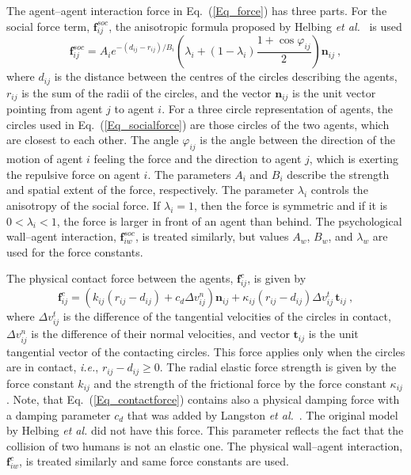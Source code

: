 \documentclass[12pt,a4paper,final,twoside]{stylevk}
\begin{document}
The agent--agent interaction force in Eq.~(\ref{Eq_force}) has three
parts.  For the social force term, $\mathbf{f}_{ij}^{soc}$, the
anisotropic formula proposed by Helbing {\em et al.}~\cite{Helbing02}
is used
%
\begin{equation}\label{Eq_socialforce}
 \mathbf{f}_{ij}^{soc} = A_i e^{-(d_{ij}-r_{ij})/B_i }
 \left ( \lambda_i + (1-\lambda_i) \frac{1 + \cos \varphi_{ij}}{2}
 \right )  \mathbf{n}_{ij} ~, 
\end{equation}
%
where $d_{ij}$ is the distance between the centres of the circles
describing the agents, $r_{ij}$ is the sum of the radii of the
circles, and the vector $\mathbf{n}_{ij}$ is the unit vector pointing
from agent $j$ to agent $i$.  For a three circle representation of
agents, the circles used in Eq.~(\ref{Eq_socialforce}) are those
circles of the two agents, which are closest to each other.  The angle
$\varphi_{ij}$ is the angle between the direction of the motion of
agent $i$ feeling the force and the direction to agent $j$, which is
exerting the repulsive force on agent $i$.  The parameters $A_i$ and
$B_i$ describe the strength and spatial extent of the force,
respectively.  The parameter $\lambda_i$ controls the anisotropy of
the social force.  If $\lambda_i=1$, then the force is symmetric and
if it is $ 0 < \lambda_i <1$, the force is larger in front of an agent
than behind.  The psychological wall--agent interaction,
$\mathbf{f}_{iw}^{soc}$, is treated similarly, but values $A_w$,
$B_w$, and $\lambda_w$ are used for the force constants.


The physical contact force between the agents, $\mathbf{f}_{ij}^{c}$,
is given by
%
\begin{equation}\label{Eq_contactforce}
  \mathbf{f}_{ij}^{c} = \left( k_{ij} (r_{ij}-d_{ij}) + c_d \Delta
    v_{ij}^{n} \right) \mathbf{n}_{ij} + \kappa_{ij} (r_{ij}-d_{ij})\Delta
  v_{ij}^{t} \, \mathbf{t}_{ij} ~,
\end{equation}
%
where $\Delta v_{ij}^{t}$ is the difference of the tangential
velocities of the circles in contact, $\Delta v_{ij}^{n}$ is the
difference of their normal velocities, and vector $\mathbf{t}_{ij}$ is
the unit tangential vector of the contacting circles.  This force
applies only when the circles are in contact, \emph{i.e.},
$r_{ij}-d_{ij} \ge 0$.  The radial elastic force strength is given by
the force constant $k_{ij}$ and the strength of the frictional force
by the force constant $\kappa_{ij}$.  Note, that
Eq.~(\ref{Eq_contactforce}) contains also a physical damping force with
a damping parameter $c_d$ that was added by Langston \emph{et
  al.}~\cite{Langston06}.  The original model by Helbing {\em et al.}
did not have this force.  This parameter reflects the fact that the
collision of two humans is not an elastic one.  The physical
wall--agent interaction, $ \mathbf{f}^{c}_{iw}$, is treated similarly
and same force constants are used.
\end{document}

